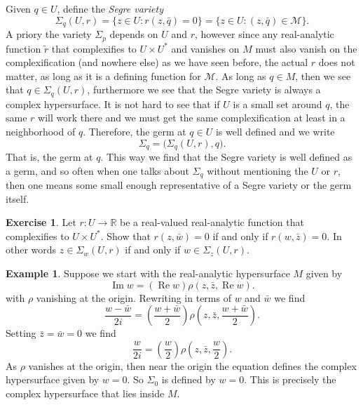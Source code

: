 \documentclass[12pt,openany]{book}
\renewcommand{\Re}{\operatorname{Re}}
\renewcommand{\Im}{\operatorname{Im}}
\newcommand{\R}{{\mathbb{R}}}
\newcommand{\sM}{{\mathcal{M}}}
\theoremstyle{plain}
\theoremstyle{remark}
\theoremstyle{definition}
\newenvironment{exbox}{%
    \def\FrameCommand{\vrule width 1pt \relax\hspace {10pt}}%
    \MakeFramed {\advance \hsize -\width \FrameRestore }%
}{%
    \endMakeFramed
}
\theoremstyle{exercise}
\newtheorem{exercise}{Exercise}[section]
\theoremstyle{example}
\newtheorem{example}[thm]{Example}
\begin{document}
Given $q \in U$,
define the \emph{Segre variety}
\begin{equation*}
\Sigma_q(U,r) = \{ z \in U : r(z,\bar{q}) = 0 \} = \{ z \in U : (z,\bar{q})
\in \sM \} .
\end{equation*}
A priory the variety $\Sigma_p$ depends on $U$ and $r$, however since any
real-analytic function $\widetilde{r}$ that complexifies to $U \times U^*$
and vanishes on $M$ must also vanish on the complexification (and nowhere
else) as we have seen
before, the actual $r$ does not matter, as long as it is a defining function
for $\sM$.  As long as $q \in M$, then we see that
$q \in \Sigma_q(U,r)$, furthermore we see that the
Segre variety is always a complex hypersurface.  It is not hard to see that
if $U$ is a small set around $q$, the same $r$ will work there and we 
must get the same complexification at least in a neighborhood of $q$.
Therefore, the germ at $q \in U$ is well defined and we write
\begin{equation*}
\Sigma_q = \bigl( \Sigma_q(U,r) , q \bigr) .
\end{equation*}
That is, the germ at $q$.  This way we find that the Segre variety is
well defined as a germ, and so often when one talks about $\Sigma_q$
without mentioning the $U$ or $r$, then one means some small enough
representative of a Segre variety or the germ itself.

\begin{exbox}
\begin{exercise}
Let $r \colon U \to \R$ be a real-valued
real-analytic function that complexifies to
$U \times U^*$.  Show that
$r(z,\bar{w}) = 0$
if and only if
$r(w,\bar{z}) = 0$.  In other words
$z \in \Sigma_w(U,r)$ if and only if
$w \in \Sigma_z(U,r)$.
\end{exercise}
\end{exbox}

\begin{example}
Suppose we start with the real-analytic hypersurface $M$ given by
\begin{equation*}
\Im w = (\Re w) \rho(z,\bar{z},\Re w) .
\end{equation*}
with $\rho$ vanishing at the origin.
Rewriting in terms of $w$ and $\bar{w}$ we find
\begin{equation*}
\frac{w-\bar{w}}{2i} = \left(\frac{w+\bar{w}}{2}\right)
\rho\left(z,\bar{z},\frac{w+\bar{w}}{2}\right) .
\end{equation*}
Setting $\bar{z} = \bar{w} = 0$ we find 
\begin{equation*}
\frac{w}{2i} = \left(\frac{w}{2}\right)
\rho\left(z,\bar{z},\frac{w}{2}\right) .
\end{equation*}
As $\rho$ vanishes at the origin, then near the origin the equation 
defines the complex hypersurface given by $w=0$.
So $\Sigma_0$ is defined by $w = 0$.
This is precisely the complex hypersurface that lies inside $M$.
\end{example}
\end{document}
